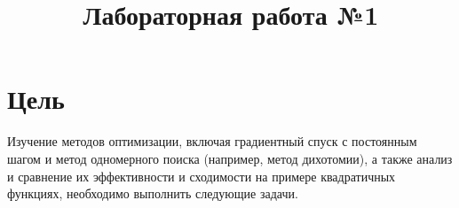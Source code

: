 \documentclass[12pt, a4paper]{article}
\begin{document}
\title{Лабораторная работа №1}
\maketitle

\tableofcontents
\newpage

\section{Цель}
Изучение методов оптимизации, включая градиентный спуск с постоянным шагом и метод одномерного поиска (например, метод дихотомии), а также анализ и сравнение их эффективности и сходимости на примере квадратичных функциях, необходимо выполнить следующие задачи.\\
\end{document}
